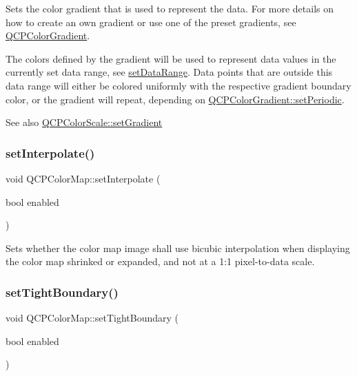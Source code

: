 Sets the color gradient that is used to represent the data. For more details on how to create an own gradient or use one of the preset gradients, see \hyperlink{classQCPColorGradient}{Q\+C\+P\+Color\+Gradient}.

The colors defined by the gradient will be used to represent data values in the currently set data range, see \hyperlink{classQCPColorMap_a980b42837821159786a85b4b7dcb8774}{set\+Data\+Range}. Data points that are outside this data range will either be colored uniformly with the respective gradient boundary color, or the gradient will repeat, depending on \hyperlink{classQCPColorGradient_a39d6448155fc00a219f239220d14bb39}{Q\+C\+P\+Color\+Gradient\+::set\+Periodic}.

\begin{DoxySeeAlso}{See also}
\hyperlink{classQCPColorScale_a1f29583bb6f1e7f473b62fb712be3940}{Q\+C\+P\+Color\+Scale\+::set\+Gradient} 
\end{DoxySeeAlso}
\mbox{\label{classQCPColorMap_a484eaa8a5065cfc386b15375bf98b964}} 
\subsubsection{\texorpdfstring{set\+Interpolate()}{setInterpolate()}}
{\footnotesize\ttfamily void Q\+C\+P\+Color\+Map\+::set\+Interpolate (\begin{DoxyParamCaption}\item[{bool}]{enabled }\end{DoxyParamCaption})}

Sets whether the color map image shall use bicubic interpolation when displaying the color map shrinked or expanded, and not at a 1\+:1 pixel-\/to-\/data scale.

\mbox{\label{classQCPColorMap_ad03221cc285e5f562a0b13d684b5576d}} 
\subsubsection{\texorpdfstring{set\+Tight\+Boundary()}{setTightBoundary()}}
{\footnotesize\ttfamily void Q\+C\+P\+Color\+Map\+::set\+Tight\+Boundary (\begin{DoxyParamCaption}\item[{bool}]{enabled }\end{DoxyParamCaption})}

